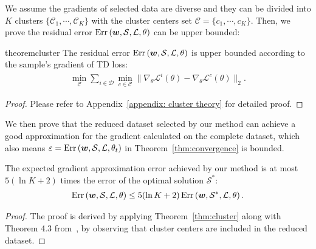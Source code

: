 We assume the gradients of selected data are diverse and they can be divided into $K$ clusters $\{\mathcal{C}_1,\cdots,\mathcal{C}_K\}$ with the cluster centers set $\mathcal C=\{c_1,\cdots,c_K\}$.
Then, we prove the residual error $\operatorname{Err}\left({\bm{w}}, \mathcal{S}, \mathcal L, \theta\right)$ can be upper bounded:

\begin{restatable}{theorem}{cluster}\label{thm:cluster}
The residual error $\operatorname{Err}\left({\bm{w}}, \mathcal{S}, \mathcal L, \theta\right)$ is upper bounded according to the sample's gradient of TD loss:
\begin{align}
    \min_{\mathcal C}\sum_{i\in\mathcal D} \min_{c\in \mathcal C}\|\nabla_{\theta} \mathcal L^i\left(\theta\right) - \nabla_{\theta} \mathcal L^c\left(\theta\right) \|_2. 
\end{align}
\end{restatable}
\begin{proof}
Please refer to Appendix~\ref{appendix: cluster theory} for detailed proof.
\end{proof}

We then prove that the reduced dataset selected by our method can achieve a good approximation for the gradient calculated on the complete dataset, which also means $\varepsilon=\operatorname{Err}\left({\bm{w}}, \mathcal{S}, \mathcal L, \theta_t\right)$ in Theorem~\ref{thm:convergence} is bounded.

\begin{corollary}\label{thm:c_bound}
    The expected gradient approximation error achieved by our method is at most $5(\ln K+2)$ times the error of the optimal solution $\mathcal{S}^*$:
    \begin{align}
        \operatorname{Err}\left({\bm{w}}, \mathcal{S}, \mathcal L, \theta\right) \le 5(\ln K+2)\operatorname{Err}\left({\bm{w}}, \mathcal{S}^*, \mathcal L, \theta\right).
    \end{align}
\end{corollary}
\begin{proof}
The proof is derived by applying Theorem~\ref{thm:cluster} along with Theorem 4.3 from~\citep{makarychev2020improved}, by observing that cluster centers are included in the reduced dataset. 
\end{proof}

